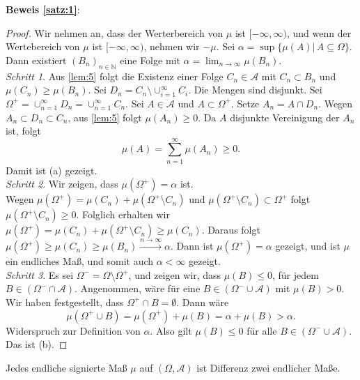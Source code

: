 \documentclass[/Users/zhangwusheng/Documents/satz von radon nikodym/satz von radon nikodym.tex]{subfiles}
\begin{document}
    \textbf{Beweis \cref{satz:1}}:
    \begin{proof}
        Wir nehmen an, dass der Werterbereich von $\mu$ ist $[-\infty, \infty)$, und wenn der Wertebereich von $\mu$ ist $[-\infty, \infty)$, nehmen wir $-\mu$.
        Sei $\alpha = \sup \{\mu(A)|\,A \subseteq \Omega\}$. Dann existiert $(B_n)_{n \in \mathbb{N}}$ eine Folge mit $\alpha = \lim_{n \to \infty} \mu(B_n)$.\\
        \textit{Schritt 1}.
        Aus \cref{lem:5} folgt die Existenz einer Folge $C_n \in \mathcal{A}$ mit $C_n \subset B_n$ und $\mu(C_n) \geq \mu(B_n)$. 
        Sei $D_n = C_n \setminus \cup_{i=1}^\infty C_i$. Die Mengen sind disjunkt. Sei $\Omega^{+} = \cup_{n=1}^\infty D_n = \cup_{n=1}^\infty C_n$. 
        Sei $A \in \mathcal{A}$ und $A \subset \Omega^{+}$. Setze $A_n = A \cap D_n$. Wegen $A_n \subset D_n \subset C_n$, aus \cref{lem:5} folgt $\mu(A_n) \geq 0$. 
        Da $A$ disjunkte Vereinigung der $A_n$ ist, folgt 
        \[\mu(A)= \sum_{n=1}^\infty \mu(A_n) \geq 0.\]
        Damit ist (a) gezeigt.\\
        \textit{Schritt 2}. Wir zeigen, dass $\mu(\Omega^{+}) = \alpha$ ist.\\
        Wegen $\mu(\Omega^{+}) = \mu(C_n) + \mu(\Omega^{+} \setminus C_n)$ und $\mu(\Omega^{+} \setminus C_n) \subset \Omega^{+}$ folgt $\mu(\Omega^{+} \setminus C_n) \geq 0$.
        Folglich erhalten wir $\mu(\Omega^{+}) = \mu(C_n) + \mu(\Omega^{+} \setminus C_n) \geq \mu(C_n)$. 
        Daraus folgt $\mu(\Omega^{+}) \geq \mu(C_n) \geq \mu(B_n) \overset{n \to \infty}{\longrightarrow} \alpha$.
        Dann ist $\mu(\Omega^{+}) = \alpha$ gezeigt, und ist $\mu$ ein endliches Maß, und somit auch $\alpha < \infty$ gezeigt.\\
        \textit{Schritt 3}. Es sei $\Omega^{-} = \Omega \setminus \Omega^{+}$, und zeigen wir, dass $\mu(B) \leq 0$, für jedem $B \in (\Omega^{-} \cap \mathcal{A})$. 
        Angenommen, wäre für eine $B \in (\Omega^{-} \cup \mathcal{A})$ mit $\mu(B) > 0$. Wir haben festgestellt, dass $\Omega^{+} \cap B = \emptyset$. Dann wäre
        \[\mu(\Omega^{+} \cup B) = \mu(\Omega^{+}) + \mu(B) = \alpha + \mu(B) > \alpha.\]
        Widerspruch zur Definition von $\alpha$. Also gilt $\mu(B) \leq 0$ für alle $B \in (\Omega^{-} \cup \mathcal{A})$. Das ist (b).
    \end{proof}
    
    \begin{corollary}\label{korollar:1}
        Jedes endliche signierte Maß $\mu$ auf $(\Omega, \mathcal{A})$ ist Differenz zwei endlicher Maße.
    \end{corollary}
    
\end{document}
